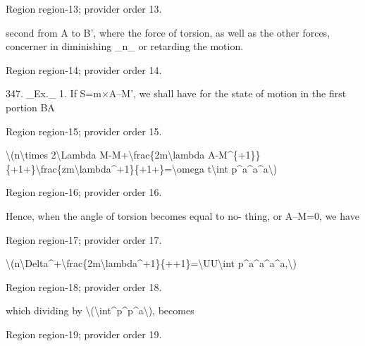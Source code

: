 \documentclass[11pt]{article}
\begin{document}
{\scriptsize\color{gray} Region region-13; provider order 13.\par}
\medskip

second from A to B’, where the force of torsion, as well as the other forces, concerner in diminishing \_n\_ or retarding the motion.
\par

{\scriptsize\color{gray} Region region-14; provider order 14.\par}
\medskip

347. \_Ex.\_ 1. If S=m×A--M’, we shall have for the state of motion in the first portion BA
\par

{\scriptsize\color{gray} Region region-15; provider order 15.\par}
\medskip

\textbackslash{}(n\textbackslash{}times 2\textbackslash{}Lambda M-M+\textbackslash{}frac\{2m\textbackslash{}lambda A-M\textasciicircum{}\{+1\}\}\{+1+\}\textbackslash{}frac\{zm\textbackslash{}lambda\textasciicircum{}+1\}\{+1+\}=\textbackslash{}omega t\textbackslash{}int p\textasciicircum{}a\textasciicircum{}a\textasciicircum{}a\textbackslash{})
\par

{\scriptsize\color{gray} Region region-16; provider order 16.\par}
\medskip

Hence, when the angle of torsion becomes equal to no- thing, or A--M=0, we have
\par

{\scriptsize\color{gray} Region region-17; provider order 17.\par}
\medskip

\textbackslash{}(n\textbackslash{}Delta\textasciicircum{}+\textbackslash{}frac\{2m\textbackslash{}lambda\textasciicircum{}+1\}\{++1\}=\textbackslash{}UU\textbackslash{}int p\textasciicircum{}a\textasciicircum{}a\textasciicircum{}a\textasciicircum{}a,\textbackslash{})
\par

{\scriptsize\color{gray} Region region-18; provider order 18.\par}
\medskip

which dividing by \textbackslash{}(\textbackslash{}int\textasciicircum{}p\textasciicircum{}p\textasciicircum{}a\textbackslash{}), becomes
\par

{\scriptsize\color{gray} Region region-19; provider order 19.\par}
\medskip
\end{document}

